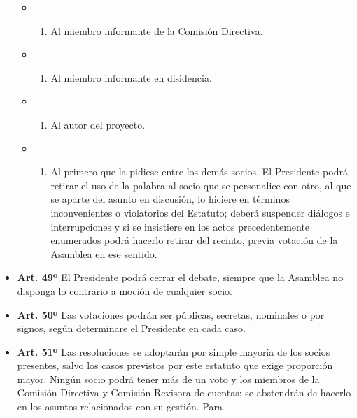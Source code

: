 \documentclass[]{book}
\providecommand{\tightlist}{%
  \setlength{\itemsep}{0pt}\setlength{\parskip}{0pt}}
\begin{document}
\begin{itemize}
  \begin{itemize}
  \item
    \begin{enumerate}
    \def\labelenumi{\alph{enumi})}
    \tightlist
    \item
      Al miembro informante de la Comisión Directiva.
    \end{enumerate}
  \item
    \begin{enumerate}
    \def\labelenumi{\alph{enumi})}
    \setcounter{enumi}{1}
    \tightlist
    \item
      Al miembro informante en disidencia.
    \end{enumerate}
  \item
    \begin{enumerate}
    \def\labelenumi{\alph{enumi})}
    \setcounter{enumi}{2}
    \tightlist
    \item
      Al autor del proyecto.
    \end{enumerate}
  \item
    \begin{enumerate}
    \def\labelenumi{\alph{enumi})}
    \setcounter{enumi}{3}
    \tightlist
    \item
      Al primero que la pidiese entre los demás socios. El Presidente
      podrá retirar el uso de la palabra al socio que se personalice con
      otro, al que se aparte del asunto en discusión, lo hiciere en
      términos inconvenientes o violatorios del Estatuto; deberá
      suspender diálogos e interrupciones y si se insistiere en los
      actos precedentemente enumerados podrá hacerlo retirar del
      recinto, previa votación de la Asamblea en ese sentido.
    \end{enumerate}
  \end{itemize}
\item
  \textbf{Art. 49º} El Presidente podrá cerrar el debate, siempre que la
  Asamblea no disponga lo contrario a moción de cualquier socio.
\item
  \textbf{Art. 50º} Las votaciones podrán ser públicas, secretas,
  nominales o por signos, según determinare el Presidente en cada caso.
\item
  \textbf{Art. 51º} Las resoluciones se adoptarán por simple mayoría de
  los socios presentes, salvo los casos previstos por este estatuto que
  exige proporción mayor. Ningún socio podrá tener más de un voto y los
  miembros de la Comisión Directiva y Comisión Revisora de cuentas; se
  abstendrán de hacerlo en los asuntos relacionados con su gestión. Para

\end{itemize}
\end{document}
